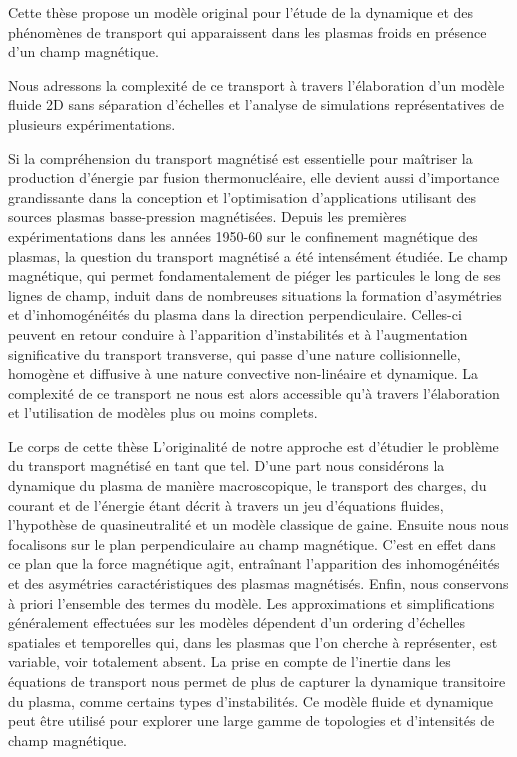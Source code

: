 
\begin{refsection}


Cette thèse propose un modèle original pour l'étude de la dynamique et des
		phénomènes de transport qui apparaissent dans les plasmas froids en présence
		d'un champ magnétique. 
		
		Nous adressons la complexité de ce transport à travers l’élaboration d'un
		modèle fluide 2D sans séparation d'échelles et l'analyse de simulations
		représentatives de plusieurs expérimentations.
			
		Si la compréhension du transport magnétisé est essentielle pour maîtriser la
		production d'énergie par fusion thermonucléaire, elle devient aussi d'importance
		grandissante dans la conception et l'optimisation d'applications utilisant des
		sources plasmas basse-pression magnétisées.
		Depuis les premières expérimentations dans les années 1950-60 sur le
		confinement magnétique des plasmas, la question du transport magnétisé a été intensément
		étudiée. Le champ magnétique, qui permet fondamentalement de piéger les
		particules le long de ses lignes de champ, induit dans de nombreuses situations la formation
		d'asymétries et d'inhomogénéités du plasma dans la direction perpendiculaire.
		Celles-ci peuvent en retour conduire à l'apparition d'instabilités et à
		l'augmentation significative du transport transverse, qui passe d'une nature
		collisionnelle, homogène et diffusive à une nature convective non-linéaire et
		dynamique. La complexité de ce transport ne nous est alors accessible qu'à
		travers l'élaboration et l'utilisation de modèles plus ou moins complets.
				
		Le corps de cette thèse L'originalité de notre approche est
		d'étudier le problème du transport magnétisé en tant que tel.
		D'une part nous considérons la dynamique du plasma de manière macroscopique, le
		transport des charges, du courant et de l'énergie étant décrit à travers un jeu
		d'équations fluides, l'hypothèse de quasineutralité et un modèle classique de
		gaine.
		Ensuite nous nous focalisons sur le plan perpendiculaire au champ magnétique.
		C'est en effet dans ce plan que la force magnétique agit, entraînant
		l'apparition des inhomogénéités et des asymétries caractéristiques des plasmas
		magnétisés.
		Enfin, nous conservons à priori l'ensemble des termes du modèle.
		Les approximations et simplifications généralement effectuées sur les
		modèles dépendent d'un ordering d'échelles spatiales et temporelles qui, dans
		les plasmas que l'on cherche à représenter, est variable, voir totalement
		absent.
		La prise en compte de l'inertie dans les équations de transport nous permet de
		plus de capturer la dynamique transitoire du plasma, comme certains types
		d'instabilités. Ce modèle fluide et dynamique peut être utilisé pour explorer
		une large gamme de topologies et d'intensités de champ magnétique.
				

\end{refsection}
